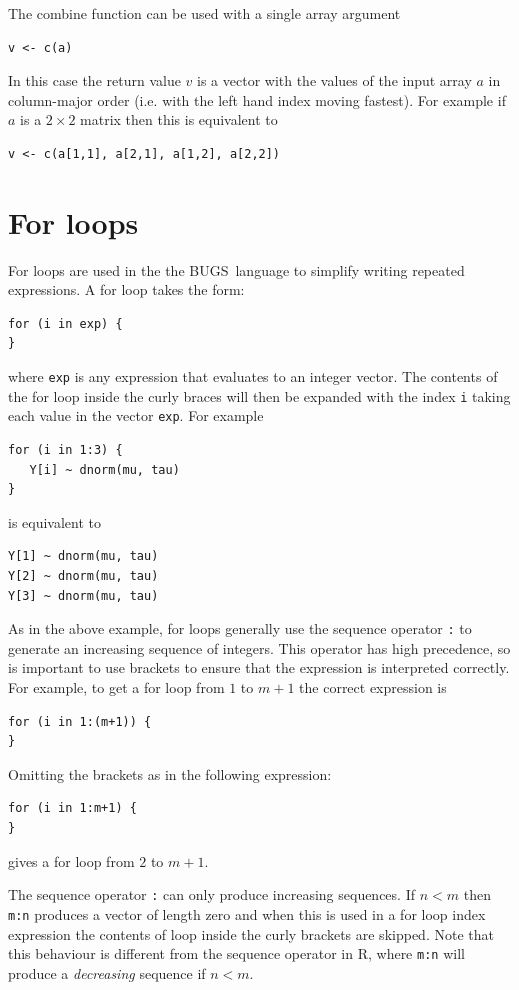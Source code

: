 \documentclass[11pt, a4paper, titlepage]{report}
\newcommand{\BUGS}{\textsf{BUGS}}
\newcommand{\R}{\textsf{R}}
\begin{document}
The combine function can be used with a single array argument
\begin{verbatim}
v <- c(a)
\end{verbatim}
In this case the return value $v$ is a vector with the values of the
input array $a$ in column-major order (i.e. with the left hand index
moving fastest). For example if $a$ is a $2 \times 2$ matrix then
this is equivalent to
\begin{verbatim}
v <- c(a[1,1], a[2,1], a[1,2], a[2,2])
\end{verbatim}

\section{For loops}
\label{section:forloops}

For loops are used in the the \BUGS\ language to simplify writing
repeated expressions. A for loop takes the form:
\begin{verbatim}
for (i in exp) {
}
\end{verbatim}
where \texttt{exp} is any expression that evaluates to an integer
vector. The contents of the for loop inside the curly braces will then
be expanded with the index \texttt{i} taking each value in the vector
\texttt{exp}. For example
\begin{verbatim}
for (i in 1:3) {
   Y[i] ~ dnorm(mu, tau)
}
\end{verbatim}
is equivalent to
\begin{verbatim}
Y[1] ~ dnorm(mu, tau)
Y[2] ~ dnorm(mu, tau)
Y[3] ~ dnorm(mu, tau)
\end{verbatim}
As in the above example, for loops generally use the sequence operator
\verb+:+ to generate an increasing sequence of integers. This operator
has high precedence, so is important to use brackets to ensure that
the expression is interpreted correctly. For example, to get a for
loop from $1$ to $m+1$ the correct expression is
\begin{verbatim}
for (i in 1:(m+1)) {
}
\end{verbatim}
Omitting the brackets as in the following expression:
\begin{verbatim}
for (i in 1:m+1) {
}
\end{verbatim}
gives a for loop from $2$ to $m+1$.

The sequence operator \verb+:+ can only produce increasing
sequences. If $n < m$ then \verb+m:n+ produces a vector of length zero
and when this is used in a for loop index expression the contents of
loop inside the curly brackets are skipped. Note that this behaviour
is different from the sequence operator in \R, where \verb+m:n+ will
produce a {\em decreasing} sequence if $n < m$.
\end{document}
